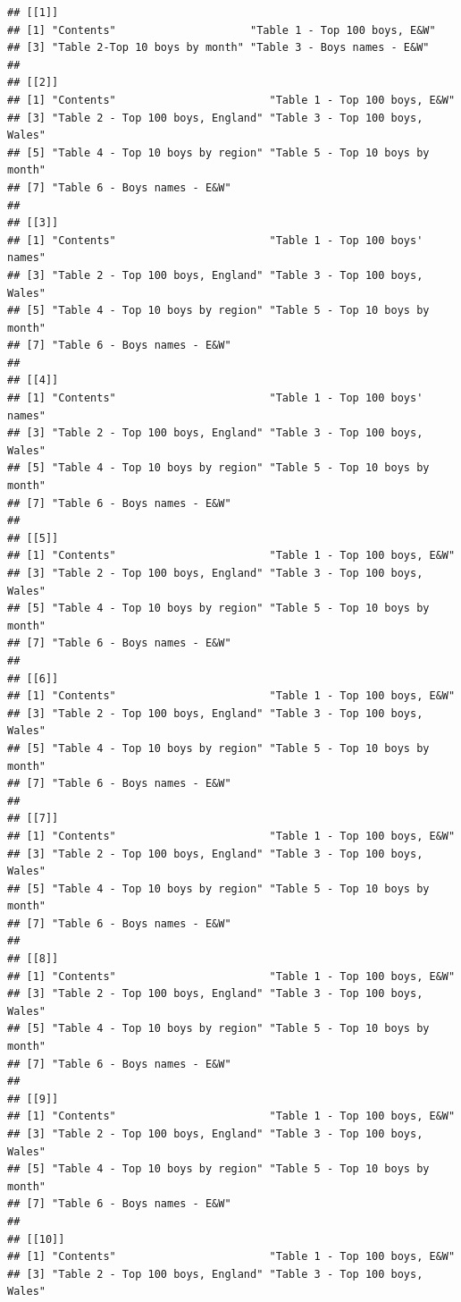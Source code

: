 \documentclass[]{book}
\begin{document}
\begin{verbatim}
## [[1]]
## [1] "Contents"                     "Table 1 - Top 100 boys, E&W" 
## [3] "Table 2-Top 10 boys by month" "Table 3 - Boys names - E&W"  
## 
## [[2]]
## [1] "Contents"                        "Table 1 - Top 100 boys, E&W"    
## [3] "Table 2 - Top 100 boys, England" "Table 3 - Top 100 boys, Wales"  
## [5] "Table 4 - Top 10 boys by region" "Table 5 - Top 10 boys by month" 
## [7] "Table 6 - Boys names - E&W"     
## 
## [[3]]
## [1] "Contents"                        "Table 1 - Top 100 boys' names"  
## [3] "Table 2 - Top 100 boys, England" "Table 3 - Top 100 boys, Wales"  
## [5] "Table 4 - Top 10 boys by region" "Table 5 - Top 10 boys by month" 
## [7] "Table 6 - Boys names - E&W"     
## 
## [[4]]
## [1] "Contents"                        "Table 1 - Top 100 boys' names"  
## [3] "Table 2 - Top 100 boys, England" "Table 3 - Top 100 boys, Wales"  
## [5] "Table 4 - Top 10 boys by region" "Table 5 - Top 10 boys by month" 
## [7] "Table 6 - Boys names - E&W"     
## 
## [[5]]
## [1] "Contents"                        "Table 1 - Top 100 boys, E&W"    
## [3] "Table 2 - Top 100 boys, England" "Table 3 - Top 100 boys, Wales"  
## [5] "Table 4 - Top 10 boys by region" "Table 5 - Top 10 boys by month" 
## [7] "Table 6 - Boys names - E&W"     
## 
## [[6]]
## [1] "Contents"                        "Table 1 - Top 100 boys, E&W"    
## [3] "Table 2 - Top 100 boys, England" "Table 3 - Top 100 boys, Wales"  
## [5] "Table 4 - Top 10 boys by region" "Table 5 - Top 10 boys by month" 
## [7] "Table 6 - Boys names - E&W"     
## 
## [[7]]
## [1] "Contents"                        "Table 1 - Top 100 boys, E&W"    
## [3] "Table 2 - Top 100 boys, England" "Table 3 - Top 100 boys, Wales"  
## [5] "Table 4 - Top 10 boys by region" "Table 5 - Top 10 boys by month" 
## [7] "Table 6 - Boys names - E&W"     
## 
## [[8]]
## [1] "Contents"                        "Table 1 - Top 100 boys, E&W"    
## [3] "Table 2 - Top 100 boys, England" "Table 3 - Top 100 boys, Wales"  
## [5] "Table 4 - Top 10 boys by region" "Table 5 - Top 10 boys by month" 
## [7] "Table 6 - Boys names - E&W"     
## 
## [[9]]
## [1] "Contents"                        "Table 1 - Top 100 boys, E&W"    
## [3] "Table 2 - Top 100 boys, England" "Table 3 - Top 100 boys, Wales"  
## [5] "Table 4 - Top 10 boys by region" "Table 5 - Top 10 boys by month" 
## [7] "Table 6 - Boys names - E&W"     
## 
## [[10]]
## [1] "Contents"                        "Table 1 - Top 100 boys, E&W"    
## [3] "Table 2 - Top 100 boys, England" "Table 3 - Top 100 boys, Wales"  

\end{verbatim}
\end{document}
